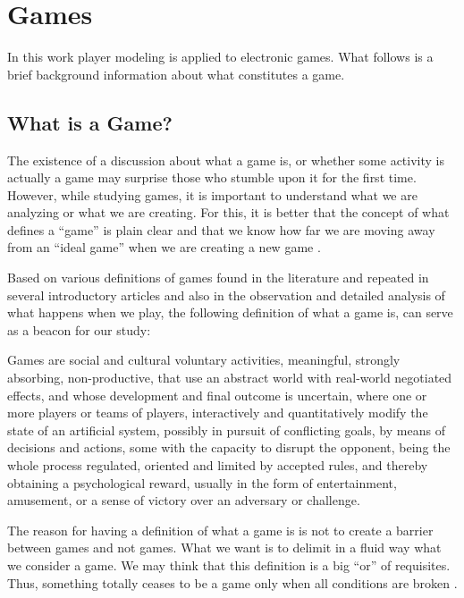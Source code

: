 \chapter{Games}
In this work player modeling is applied to electronic games. What follows is a brief background information about what constitutes a game.

\section{What is a Game?}
The existence of a discussion about what a game is, or whether some activity is actually a game may surprise those who stumble upon it for the first time. However, while studying games, it is important to understand what we are analyzing or what we are creating. For this, it is better that the concept of what defines a \enquote{game} is plain clear and that we know how far we are moving away from an \enquote{ideal game} when we are creating a new game \citep{XexeoGeraldoquesaoJogos2013}.

Based on various definitions of games found in the literature and repeated in several introductory articles and also in the observation and detailed analysis of what happens when we play, the following definition of what a game is, can serve as a beacon for our study:

\begin{displayquote}
    Games are social and cultural voluntary activities, meaningful, strongly absorbing, non-productive, that use an abstract world with real-world negotiated effects, and whose development and final outcome is uncertain, where one or more players or teams of players, interactively and quantitatively modify the state of an artificial system, possibly in pursuit of conflicting goals, by means of decisions and actions, some with the capacity to disrupt the opponent, being the whole process regulated, oriented and limited by accepted rules, and thereby obtaining a psychological reward, usually in the form of entertainment, amusement, or a sense of victory over an adversary or challenge.
\end{displayquote}

The reason for having a definition of what a game is is not to create a barrier between games and not games. What we want is to delimit in a fluid way what we consider a game. We may think that this definition is a big \enquote{or} of requisites. Thus, something totally ceases to be a game only when all conditions are broken  \citep{XexeoGeraldoquesaoJogos2013}.

